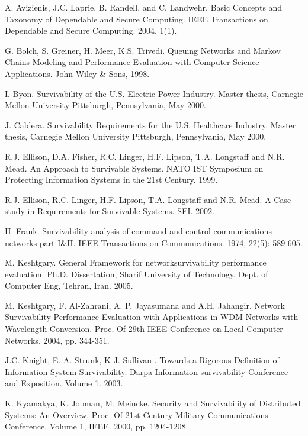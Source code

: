 \documentclass[onecolumn,conference]{IEEEtran}
\begin{document}
    \begin{thebibliography}{00}
         A. Avizienis, J.C. Laprie, B. Randell, and C. Landwehr. Basic Concepts and Taxonomy of Dependable and Secure Computing. IEEE Transactions on Dependable and Secure Computing. 2004, 1(1).

         G. Bolch, S. Greiner, H. Meer, K.S. Trivedi. Queuing Networks and Markov Chains Modeling and Performance Evaluation with Computer Science Applications. John Wiley \& Sons, 1998.

         I. Byon. Survivability of the U.S. Electric Power Industry. Master thesis, Carnegie Mellon University Pittsburgh, Pennsylvania, May 2000.

         J. Caldera. Survivability Requirements for the U.S. Healthcare Industry. Master thesis, Carnegie Mellon University Pittsburgh, Pennsylvania, May 2000.

         R.J. Ellison, D.A. Fisher, R.C. Linger, H.F. Lipson, T.A. Longstaff and N.R. Mead. An Approach to Survivable Systems. NATO IST Symposium on Protecting Information Systems in the 21st Century. 1999.

         R.J. Ellison, R.C. Linger, H.F. Lipson, T.A. Longstaff and N.R. Mead. A Case study in Requirements for Survivable Systems. SEI. 2002.

         H. Frank. Survivability analysis of command and control communications networks-part I\&II. IEEE Transactions on Communications. 1974, 22(5): 589-605.

         M. Keshtgary. General Framework for networksurvivability performance evaluation. Ph.D. Dissertation, Sharif University of Technology, Dept. of Computer Eng, Tehran, Iran. 2005.

         M. Keshtgary, F. Al-Zahrani, A. P. Jayasumana and A.H. Jahangir. Network Survivability Performance Evaluation with Applications in WDM Networks with Wavelength Conversion. Proc. Of 29th IEEE Conference on Local Computer Networks. 2004, pp. 344-351.

         J.C. Knight, E. A. Strunk, K J. Sullivan . Towards a Rigorous Definition of Information System Survivability. Darpa Information survivability Conference and Exposition. Volume 1. 2003.

         K. Kyamakya, K. Jobman, M. Meincke. Security and Survivability of Distributed Systems: An Overview. Proc. Of 21st Century Military Communications Conference, Volume 1, IEEE. 2000, pp. 1204-1208.


\end{thebibliography}
\end{document}
